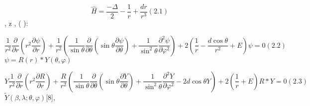\documentclass[a4paper]{article}
\begin{document}
\begin{equation*}
\widehat  H=\frac{-{\Delta}} 2-\frac 1 r+\frac{\mathit{dr}}{r^3}(2.1)
\end{equation*}
{\CYRP}{\cyrr}{\cyri} {\cyrv}{\cyrery}{\cyrb}{\cyro}{\cyrr}{\cyre}
{\cyrs}{\cyrf}{\cyre}{\cyrr}{\cyri}{\cyrch}{\cyre}{\cyrs}{\cyrk}{\cyro}{\cyrishrt}
{\cyrs}{\cyri}{\cyrs}{\cyrt}{\cyre}{\cyrm}{\cyrery} {\cyrk}{\cyro}{\cyro}{\cyrr}{\cyrd}{\cyri}{\cyrn}{\cyra}{\cyrt},
{\cyrv} {\cyrk}{\cyro}{\cyrt}{\cyro}{\cyrr}{\cyro}{\cyrishrt} {\cyro}{\cyrs}{\cyrsftsn} \foreignlanguage{english}{z}
{\cyrs}{\cyro}{\cyrn}{\cyra}{\cyrp}{\cyrr}{\cyra}{\cyrv}{\cyrl}{\cyre}{\cyrn}{\cyra} {\cyrs}
{\cyrn}{\cyra}{\cyrp}{\cyrr}{\cyra}{\cyrv}{\cyrl}{\cyre}{\cyrn}{\cyri}{\cyre}{\cyrm}
{\cyrd}{\cyri}{\cyrp}{\cyro}{\cyrl}{\cyrsftsn}{\cyrn}{\cyro}{\cyrg}{\cyro}
{\cyrm}{\cyro}{\cyrm}{\cyre}{\cyrn}{\cyrt}{\cyra}, {\cyru}{\cyrr}{\cyra}{\cyrv}{\cyrn}{\cyre}{\cyrn}{\cyri}{\cyre}
{\CYRSH}{\cyrr}{\cyre}{\cyrd}{\cyri}{\cyrn}{\cyrg}{\cyre}{\cyrr}{\cyra} {\cyrb}{\cyru}{\cyrd}{\cyre}{\cyrt}
{\cyrv}{\cyrery}{\cyrg}{\cyrl}{\cyrya}{\cyrd}{\cyre}{\cyrt}{\cyrsftsn} {\cyrt}{\cyra}{\cyrk}
({\cyri}{\cyrs}{\cyrp}{\cyro}{\cyrl}{\cyrsftsn}{\cyrz}{\cyru}{\cyre}{\cyrm}
{\cyra}{\cyrt}{\cyro}{\cyrm}{\cyrn}{\cyru}{\cyryu} {\cyrs}{\cyri}{\cyrs}{\cyrt}{\cyre}{\cyrm}{\cyru}
{\cyre}{\cyrd}{\cyri}{\cyrn}{\cyri}{\cyrc}):

\begin{equation*}
\frac 1{r^2}\frac{{\partial}}{{\partial}r}\left(r^2\frac{{\partial}\psi }{{\partial}r}\right)+\frac 1{r^2}\left(\frac
1{\sin \theta }\frac{{\partial}}{{\partial}\theta }\left(\sin \theta \frac{{\partial}\psi }{{\partial}\theta
}\right)+\frac 1{\sin ^2\theta }\frac{{\partial}^2\psi }{{\partial}\varphi ^2}\right)+2\left(\frac 1 r-\frac{d\cos
\theta }{r^2}+E\right)\psi =0(2.2)
\end{equation*}
{\CYRR}{\cyra}{\cyrz}{\cyrd}{\cyre}{\cyrl}{\cyri}{\cyrm}
{\cyrp}{\cyre}{\cyrr}{\cyre}{\cyrm}{\cyre}{\cyrn}{\cyrn}{\cyrery}{\cyre}  $\psi =R\left(r\right)\ast Y(\theta ,\varphi
)$

\begin{equation*}
Y\frac 1{r^2}\frac{{\partial}}{{\partial}r}\left(r^2\frac{{\partial}R}{{\partial}r}\right)+\frac R{r^2}\left(\frac
1{\sin \theta }\frac{{\partial}}{{\partial}\theta }\left(\sin \theta \frac{{\partial}Y}{{\partial}\theta }\right)+\frac
1{\sin ^2\theta }\frac{{\partial}^2Y}{{\partial}\varphi ^2}-2d\cos \theta Y\right)+2\left(\frac 1 r+E\right)R\ast
Y=0(2.3)
\end{equation*}
{\CYRV}{\cyrv}{\cyre}{\cyrd}{\cyre}{\cyrm} {\cyrf}{\cyru}{\cyrn}{\cyrk}{\cyrc}{\cyri}{\cyri}  $\widetilde Y(\beta
,\lambda ;\theta ,\varphi )$[8], {\cyrk}{\cyro}{\cyrt}{\cyro}{\cyrr}{\cyrery}{\cyre}
{\cyru}{\cyrd}{\cyro}{\cyrv}{\cyrl}{\cyre}{\cyrt}{\cyrv}{\cyro}{\cyrr}{\cyrya}{\cyryu}{\cyrt}
{\cyru}{\cyrr}{\cyra}{\cyrv}{\cyrn}{\cyre}{\cyrn}{\cyri}{\cyryu}
\end{document}
